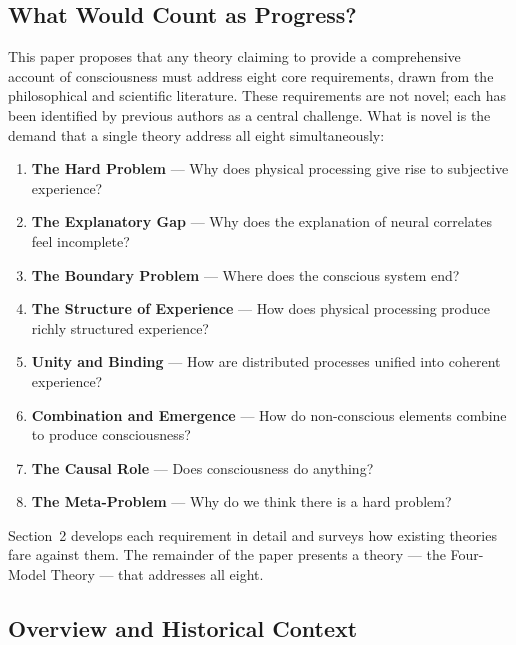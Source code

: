\documentclass[12pt]{article}
\begin{document}
\subsection{What Would Count as Progress?}


This paper proposes that any theory claiming to provide a comprehensive account of consciousness must address eight core requirements, drawn from the philosophical and scientific literature. These requirements are not novel; each has been identified by previous authors as a central challenge. What is novel is the demand that a single theory address all eight simultaneously:

\begin{enumerate}
\item \textbf{The Hard Problem} \citep{Chalmers1995} --- Why does physical processing give rise to subjective experience?
\item \textbf{The Explanatory Gap} \citep{Levine1983} --- Why does the explanation of neural correlates feel incomplete?
\item \textbf{The Boundary Problem} \citep{Bayne2010,Tononi2004} --- Where does the conscious system end?
\item \textbf{The Structure of Experience} \citep{Nagel1974} --- How does physical processing produce richly structured experience?
\item \textbf{Unity and Binding} \citep{Treisman1980,Revonsuo1999} --- How are distributed processes unified into coherent experience?
\item \textbf{Combination and Emergence} \citep{Chalmers2016} --- How do non-conscious elements combine to produce consciousness?
\item \textbf{The Causal Role} \citep{Jackson1982} --- Does consciousness do anything?
\item \textbf{The Meta-Problem} \citep{Chalmers2018} --- Why do we think there is a hard problem?
\end{enumerate}

Section~2 develops each requirement in detail and surveys how existing theories fare against them. The remainder of the paper presents a theory --- the Four-Model Theory --- that addresses all eight.


\subsection{Overview and Historical Context}
\end{document}
